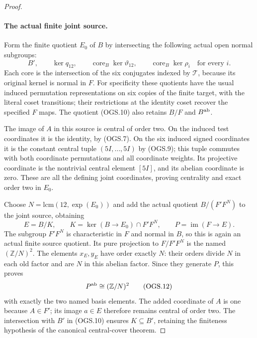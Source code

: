\begin{proof}
\paragraph{The actual finite joint source.}
Form the finite quotient $E_0$ of $B$ by intersecting
the following actual open normal subgroups:
\[
 B',\qquad \ker q_{12},\qquad
 \operatorname{core}_B\ker\vartheta_{12},\qquad
 \operatorname{core}_B\ker\rho_i\quad\text{for every }i.
                                                               \tag{OGS.10}
\]
Each core is the intersection of the six conjugates
indexed by $\mathcal T$, because its original kernel
is normal in $F$.
For specificity these quotients have the usual
induced permutation representations on six copies
of the finite target, with the literal coset transitions;
their restrictions at the identity coset recover the
specified $F$ maps.
The quotient (OGS.10) also retains $B/F$ and $B^{\rm ab}$.

The image of $A$ in this source is central of order
two.  On the induced test coordinates it is the
identity, by (OGS.7).  On the six induced signed
coordinates it is the constant central tuple
$(5I,\ldots,5I)$ by (OGS.9); this tuple commutes
with both coordinate permutations and all coordinate
weights.  Its projective coordinate is the nontrivial
central element $[5I]$, and its abelian coordinate
is zero.  These are all the defining joint coordinates,
proving centrality and exact order two in $E_0$.

Choose
$N=\mathrm{lcm}(12,\exp(E_0))$ and add the actual
quotient $B/(F'F^N)$ to the joint source, obtaining
\[
 E=B/K,\qquad
 K=\ker(B\to E_0)\cap F'F^N,\qquad P=\operatorname{im}(F\to E).
                                                               \tag{OGS.11}
\]
The subgroup $F'F^N$ is characteristic in $F$ and
normal in $B$, so this is again an actual finite
source quotient.  Its pure projection to
$F/F'F^N$ is the named $(\mathbb Z/N)^2$.
The elements $x_E,y_E$ have order exactly $N$:
their orders divide $N$ in each old factor and
are $N$ in this abelian factor.
Since they generate $P$, this proves
\[
                 P^{\rm ab}\cong(\mathbb Z/N)^2
                                                               \tag{OGS.12}
\]
with exactly the two named basis elements.
The added coordinate of $A$ is one because $A\in F'$;
its image $a\in E$ therefore remains central of order two.
The intersection with $B'$ in (OGS.10) ensures
$K\subseteq B'$, retaining the finiteness hypothesis
of the canonical central-cover theorem.


\end{proof}
